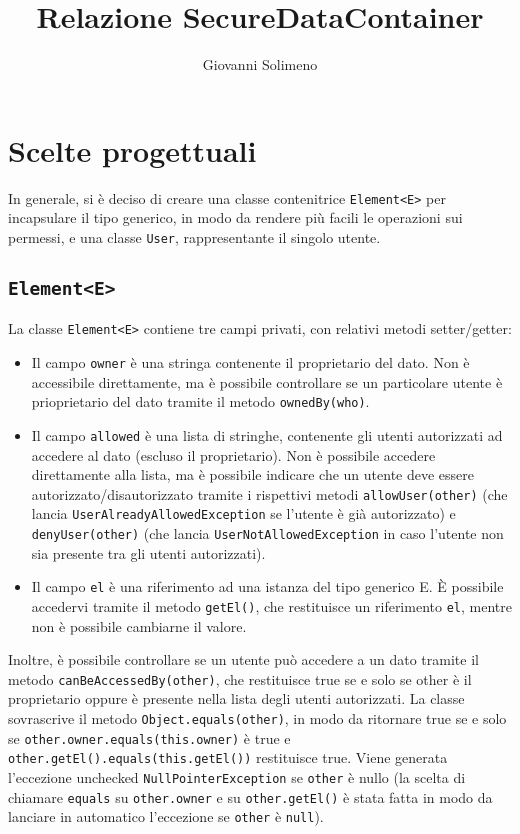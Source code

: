 \documentclass{article}
\title{Relazione SecureDataContainer}
\author{Giovanni Solimeno}
\begin{document}
	\maketitle
	
	\newpage
	
	\section[Scelte progettuali]{Scelte progettuali}
	In generale, si è deciso di creare una classe contenitrice \texttt{Element<E>} per incapsulare il tipo generico, in modo da rendere più facili le operazioni sui permessi, e una classe \texttt{User}, rappresentante il singolo utente.

\subsection{\texttt{Element<E>}}
La classe \texttt{Element<E>} contiene tre campi privati, con relativi metodi setter/getter:
\begin{itemize}
\item Il campo \texttt{owner} è una stringa contenente il proprietario del dato.
Non è accessibile direttamente, ma è possibile controllare se un particolare utente è prioprietario del dato tramite il metodo \texttt{ownedBy(who)}.

\item Il campo \texttt{allowed} è una lista di stringhe, contenente gli utenti autorizzati ad accedere al dato (escluso il proprietario). 
Non è possibile accedere direttamente alla lista, ma è possibile indicare che un utente deve essere autorizzato/disautorizzato tramite i rispettivi metodi \texttt{allowUser(other)} (che lancia \texttt{UserAlreadyAllowedException} se l'utente è già autorizzato) e \texttt{denyUser(other)} (che lancia \texttt{UserNotAllowedException} in caso l'utente non sia presente tra gli utenti autorizzati).

\item Il campo \texttt{el} è una riferimento ad una istanza del tipo generico E. È possibile accedervi tramite il metodo \texttt{getEl()}, che restituisce un riferimento \texttt{el}, mentre non è possibile cambiarne il valore.
\end{itemize}
Inoltre, è possibile controllare se un utente può accedere a un dato tramite il metodo \texttt{canBeAccessedBy(other)}, che restituisce true se e solo se other è il proprietario oppure è presente nella lista degli utenti autorizzati.\break
La classe sovrascrive il metodo \texttt{Object.equals(other)}, in modo da ritornare true se e solo se \texttt{other.owner.equals(this.owner)} è true e \break\texttt{other.getEl().equals(this.getEl())} restituisce true. \break Viene generata l'eccezione unchecked \texttt{NullPointerException} se \texttt{other} è nullo (la scelta di chiamare \texttt{equals} su \texttt{other.owner} e su \texttt{other.getEl()} è stata fatta in modo da lanciare in automatico l'eccezione se \texttt{other} è \texttt{null}).
\end{document}
